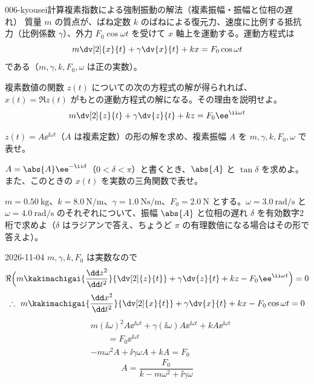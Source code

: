 \documentclass[uplatex,dvipdfmx,a4paper,11pt]{jsarticle}
\begin{document}
\begin{mondai}{006-kyousei}{計算}{複素指数による強制振動の解法（複素振幅・振幅と位相の遅れ）}
質量 $m$ の質点が、ばね定数 $k$ のばねによる復元力、速度に比例する抵抗力（比例係数 $\gamma$）、外力 $F_{0}\cos\omega t$ を受けて $x$ 軸上を運動する。運動方程式は
  \[ m\dv[2]{x}{t}+\gamma\dv{x}{t}+kx=F_{0}\cos\omega t \]
  である（$m,\gamma,k,F_{0},\omega$ は正の実数）。
  \begin{shoumon}
    \item 複素数値の関数 $z(t)$ についての次の方程式の解が得られれば、$x(t)=\Re z(t)$ がもとの運動方程式の解になる。その理由を説明せよ。
    \[ m\dv[2]{z}{t}+\gamma\dv{z}{t}+kz=F_{0}\ee^{\ii\omega t} \]
    \item $z(t)=A\ee^{\ii\omega t}$（$A$ は複素定数）の形の解を求め、複素振幅 $A$ を $m,\gamma,k,F_{0},\omega$ で表せ。
    \item $A=\abs{A}\ee^{-\ii\delta}$（$0<\delta<\pi$）と書くとき、$\abs{A}$ と $\tan\delta$ を求めよ。また、このときの $x(t)$ を実数の三角関数で表せ。
    \item $m=\qty{0.50}{\kilogram}$、$k=\qty{8.0}{\newton\per\metre}$、$\gamma=\qty{1.0}{\newton\second\per\metre}$、$F_{0}=\qty{2.0}{\newton}$ とする。$\omega=\qty{3.0}{\radian\per\second}$ と $\omega=\qty{4.0}{\radian\per\second}$ のそれぞれについて、振幅 $\abs{A}$ と位相の遅れ $\delta$ を有効数字2桁で求めよ（$\delta$ はラジアンで答え、ちょうど $\pi$ の有理数倍になる場合はその形で答えよ）。
  \end{shoumon}
\begin{kotaeutsushi}{2026-11-04}
$m,\gamma,k,F_{0}$ は実数なので
\[ \Re\Bigl(m\kakimachigai{\frac{\dd z^{2}}{\dd t^{2}}}{\dv[2]{z}{t}}+\gamma\dv{z}{t}+kz-F_{0}\ee^{\ii\omega t}\Bigr)=0 \]
\[ \therefore\ m\kakimachigai{\frac{\dd x^{2}}{\dd t^{2}}}{\dv[2]{x}{t}}+\gamma\dv{x}{t}+kx-F_{0}\cos\omega t=0 \]
\begin{align*}
&m(\ii\omega)^{2}A\ee^{\ii\omega t}+\gamma(\ii\omega)A\ee^{\ii\omega t}+kA\ee^{\ii\omega t}\\
&\qquad=F_{0}\ee^{\ii\omega t}\\
&-m\omega^{2}A+\ii\gamma\omega A+kA=F_{0}
\end{align*}
\[ A=\frac{F_{0}}{k-m\omega^{2}+\ii\gamma\omega} \]
\begin{align*}

\end{align*}
\end{kotaeutsushi}
\end{mondai}
\end{document}

